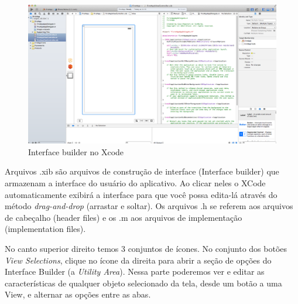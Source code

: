 \documentclass[a4paper,12pt,brazil,oneside]{book}
\begin{document}
\begin{figure}[H]
  \centering
  \includegraphics[width=.99\textwidth]{figuras/3/tela_novo_projeto_10.png}
  \caption{Interface builder no Xcode}
  \label{fig:a}
\end{figure}


Arquivos .xib são arquivos de construção de interface (Interface builder) que armazenam a interface do usuário do aplicativo. Ao clicar neles o XCode automaticamente exibirá a interface para que você possa edita-lá através do método \emph{drag-and-drop} (arrastar e soltar).
Os arquivos .h se referem aos arquivos de cabeçalho (header files) e os .m aos arquivos de implementação (implementation files).


No canto superior direito temos 3 conjuntos de ícones. No conjunto dos botões \emph{View Selections}, clique no ícone da direita para abrir a seção de opções do Interface Builder (a \emph{Utility Area}). Nessa parte poderemos ver e editar as características de qualquer objeto selecionado da tela, desde um botão a uma View, e alternar as opções entre as abas.
\end{document}
